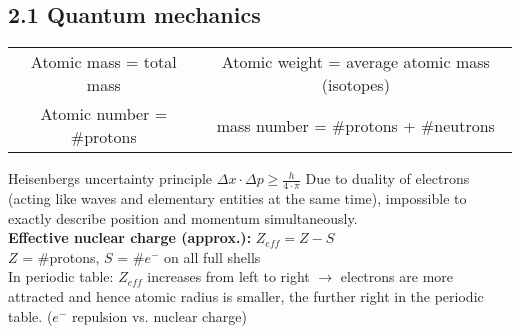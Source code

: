 \subsection{2.1 Quantum mechanics}
    \begin{scriptsize}
        \begin{tabular}{c c}
            Atomic mass = total mass & Atomic weight = average atomic mass (isotopes)\\
            Atomic number = \#protons & mass number = \#protons + \#neutrons
        \end{tabular}
    \end{scriptsize}
        \vspace*{0.0em}
        
        Heisenbergs uncertainty principle $\Delta x \cdot \Delta p \geq \frac{h}{4 \cdot \pi}$ Due to duality of electrons (acting like waves and elementary entities at the same time), impossible to exactly describe position and momentum simultaneously.\\
        \textbf{Effective nuclear charge (approx.):}   $Z_{eff} = Z-S$\\
        $Z$ = \#protons, $S$ = \#$e^-$ on all full shells
        \vspace{1mm}\\
        In periodic table: $Z_{eff}$ increases from left to right $\rightarrow$ electrons are more attracted and hence atomic radius is smaller, the further right in the periodic table. ($e^-$ repulsion vs. nuclear charge)
        \vspace*{0.0em}